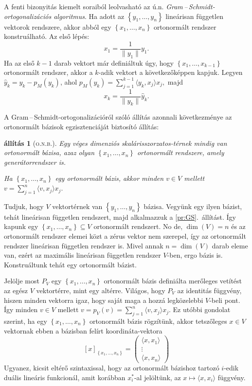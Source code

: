 \documentclass[a4paper, showtrims]{memoir}
\makeatletter
\renewenvironment{proof}[1][\proofname]
    {\par\pushQED{\qed}%
    \normalfont \topsep6\p@\@plus6\p@\relax
    \trivlist
    \item[\hskip\labelsep
        \itshape
    #1\@addpunct{:}]\ignorespaces}
    {\popQED\endtrivlist\@endpefalse}
\theoremstyle{plain}
\newtheorem{proposition}{állítás}[chapter]
\theoremstyle{remark}
\theoremstyle{definition}
\newcommand{\ip}[2]{\langle#1,#2\rangle}
\makeatother
\begin{document}
A fenti bizonyitás kiemelt soraiból leolvasható az ú.n. \emph{Gram\,--\,Schmidt-ortogonalizációs algoritmus}.
Ha adott az $\left\{ y_1,\ldots,y_n \right\}$ lineárisan független vektorok rendszere, akkor abból egy
$\left\{ x_1,\ldots,x_n \right\}$ ortonormált rendszer konstruálható.
Az első lépés:
\[
	x_1=\frac{1}{\|y_1\|}y_1.
\]
Ha az első $k-1$ darab vektort már definiáltuk úgy, hogy $\left\{ x_1,\ldots,x_{k-1} \right\}$ ortonormált rendszer,
akkor a $k$-adik vektort a következőképpen kapjuk.
Legyen $\hat{y}_k=y_k-p_M\left( y_k \right)$,
ahol
$p_M\left( y_k \right)=\sum_{j=1}^{k-1}\ip{y_k}{x_j}x_j,$
majd
\[
	x_k=\frac{1}{\|\hat{y}_k\|}\hat{y}_k.
\]

A Gram\,--\,Schmidt-ortogonalizációról szóló állítás azonnali következménye az ortonormált bázisok egzisztenciáját biztosító állítás:
\begin{proposition}[\textsc{o.n.b.}]\label{pr:onb}
	Egy véges dimenziós skalárisszorzatos-térnek mindig van ortonormált bázisa, azaz olyan $\left\{ x_1,\ldots,x_n \right\}$ ortonormált
	rendszere, amely generátorrendszer is.

	Ha $\left\{ x_1,\ldots,x_n \right\}$ egy ortonormált bázis, akkor minden $v\in V$ mellett
	\(
	v=
	\sum_{j=1}^n\ip{v}{x_j}x_j.
	\)
\end{proposition}
\begin{proof}
	Tudjuk, hogy $V$ vektortérnek van $\left\{ y_1,\ldots,y_n \right\}$ bázisa.
	Vegyünk egy ilyen bázist, tehát lineárisan független rendszert, majd alkalmazzuk a \ref{pr:GS}.~állítást.
	Így kapunk egy
	\begin{math}
		\left\{ x_1,\ldots,x_n \right\}\subseteq V
	\end{math}
	ortonormált rendszert.
	No de, $\dim(V)=n$ és az ortonormált rendszer elemei közt a zérus vektor nem szerepel,
	így az ortonormált rendszer lineárisan független rendszer is.
	Mivel annak $n=\dim(V)$ darab eleme van,
	ezért az maximális lineárisan független rendszer $V$-ben, ergo bázis is.
	Konstruáltunk tehát egy ortonormált bázist.

	Jelölje most $P_V$ egy $\left\{ x_1,\ldots,x_n \right\}$
	ortonormált bázis definiálta merőleges vetítést az egész $V$ vektortérre, mint egy altérre.
	Világos, hogy $P_V$ az identitás függvény,
	hiszen minden vektorra igaz, hogy saját maga a hozzá legközelebbi $V$-beli pont.
	Így minden $v\in V$ mellett $v=p_V\left( v \right)=\sum_{j=1}^n\ip{v}{x_j}x_j.$
\end{proof}
Ez utóbbi gondolat szerint,
ha egy $\left\{ x_1,\ldots,x_n \right\}$ ortonormált bázis rögzítünk,
akkor tetszőleges $x\in V$ vektornak ebben a bázisban felírt koordináta-vektora
\[
	[x]_{\left\{x_1,\ldots,x_n\right\}}
	=
	\begin{pmatrix}
		\ip{x}{x_1} \\ \vdots \\\ip{x}{x_n}
	\end{pmatrix}
\]
Ugyanez, kicsit eltérő szintaxissal, hogy az ortonormált bázishoz tartozó
$i$-edik duális lineáris funkcionál,
amit korábban $x_i^\ast$-al jelöltünk, az $x\mapsto\ip{x}{x_i}$
függvény.
\end{document}
